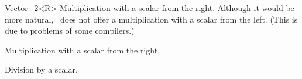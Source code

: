 \begin{ccRefClass} {Vector_2<R>}
       {Multiplication with a scalar from the right. Although it would
        be more natural, \cgal\ does not offer a multiplication with a 
        scalar from the left. (This is due to problems of some compilers.)}

       {Multiplication with a scalar from the right.}



       {Division by a scalar.}

\ccSeeAlso
{}

\end{ccRefClass} 

